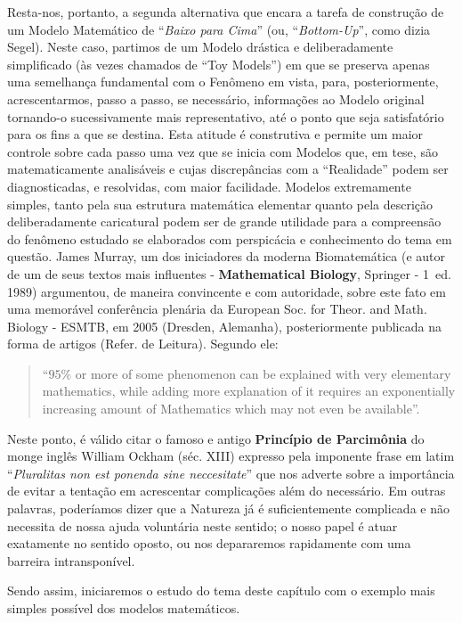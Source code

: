     Resta-nos, portanto, a segunda alternativa que encara a tarefa de construção de um Modelo Matemático de ``\textit{Baixo para Cima}'' (ou, ``\textit{Bottom-Up}'', como dizia Segel). Neste caso, partimos de um Modelo drástica e deliberadamente simplificado (às vezes chamados de ``Toy Models'') em que se preserva apenas uma semelhança fundamental com o Fenômeno em vista, para, posteriormente, acrescentarmos, passo a passo, se necessário, informações ao Modelo original tornando-o sucessivamente mais representativo, até o ponto que seja satisfatório para os fins a que se destina. Esta atitude é construtiva e permite um maior controle sobre cada passo uma vez que se inicia com Modelos que, em tese, são matematicamente analisáveis e cujas discrepâncias com a ``Realidade'' podem ser diagnosticadas, e resolvidas, com maior facilidade. Modelos extremamente simples, tanto pela sua estrutura matemática elementar quanto pela descrição deliberadamente caricatural podem ser de grande utilidade para a compreensão do fenômeno estudado se elaborados com perspicácia e conhecimento do tema em questão. James Murray, um dos iniciadores da moderna Biomatemática (e autor de um de seus textos mais influentes - \textbf{Mathematical Biology}, Springer - 1\textordfeminine\ ed. 1989) argumentou, de maneira convincente e com autoridade, sobre este fato em uma memorável conferência plenária da European Soc. for Theor. and Math. Biology - ESMTB, em 2005 (Dresden, Alemanha), posteriormente publicada na forma de artigos (Refer. de Leitura). Segundo ele:

\begin{quote}
    ``\(95\%\) or more of some phenomenon can be explained with very elementary mathematics, while adding more explanation of it requires an exponentially increasing amount of Mathematics which may not even be available''.
\end{quote}

    Neste ponto, é válido citar o famoso e antigo \textbf{Princípio de Parcimônia} do monge inglês William Ockham (séc. XIII) expresso pela imponente frase em latim ``\textit{Pluralitas non est ponenda sine neccesitate}'' que nos adverte sobre a importância de evitar a tentação em acrescentar complicações além do necessário. Em outras palavras, poderíamos dizer que a Natureza já é suficientemente complicada e não necessita de nossa ajuda voluntária neste sentido; o nosso papel é atuar exatamente no sentido oposto, ou nos depararemos rapidamente com uma barreira intransponível.

    Sendo assim, iniciaremos o estudo do tema deste capítulo com o exemplo mais simples possível dos modelos matemáticos.

